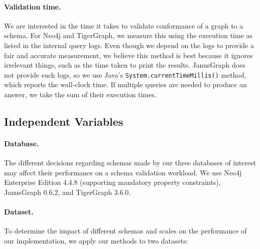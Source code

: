\documentclass{report}
\theoremstyle{definition}
\begin{document}
\paragraph{Validation time.} We are interested in the time it takes to validate conformance of a graph to a schema. For Neo4j and TigerGraph, we measure this using the execution time as listed in the internal query logs. Even though we depend on the logs to provide a fair and accurate measurement, we believe this method is best because it ignores irrelevant things, such as the time taken to print the results. JanusGraph does not provide such logs, so we use Java's \texttt{System.currentTimeMillis()} method, which reports the wall-clock time. If multiple queries are needed to produce an answer, we take the sum of their execution times.

\subsection{Independent Variables}

\paragraph{Database.} The different decisions regarding schemas made by our three databases of interest may affect their performance on a schema validation workload. We use Neo4j Enterprise Edition 4.4.8 (supporting mandatory property constraints), JanusGraph 0.6.2, and TigerGraph 3.6.0.

\paragraph{Dataset.} To determine the impact of different schemas and scales on the performance of our implementation, we apply our methods to two datasets:
\end{document}
